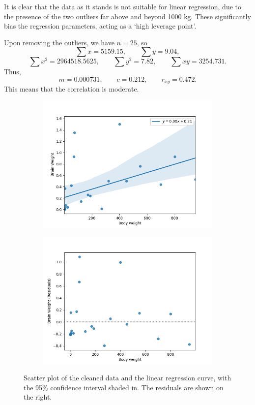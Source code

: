\documentclass[10pt]{article}
\begin{document}
        It is clear that the data as it stands is not suitable for linear regression, due to the presence of the two outliers far above and beyond 
        1000 kg. These significantly bias the regression parameters, acting as a `high leverage point'.
        
        Upon removing the outliers, we have $n = 25$, so
        \[
                \sum x = 5159.15, \qquad \sum y = 9.04,
        \]\[
                \sum x^2 = 2964518.5625, \qquad \sum y^2 = 7.82, \qquad \sum xy = 3254.731.
        \]
        Thus,
        \[
                m = 0.000731, \qquad c = 0.212, \qquad r_{xy} = 0.472.
        \]
        This means that the correlation is moderate.
        \begin{figure}[H]
        \centering
        \begin{subfigure}[b]{0.49\textwidth}
                \includegraphics[width=\textwidth]{./10_4_1x.png}
        \end{subfigure}
        \begin{subfigure}[b]{0.49\textwidth}
                \includegraphics[width=\textwidth]{./10_4_2x.png}
        \end{subfigure}
        \caption{Scatter plot of the cleaned data and the linear regression curve, with the 95\% confidence interval shaded in.
        The residuals are shown on the right.}
        \label{fig:brain_clean}
        \end{figure}
\end{document}
